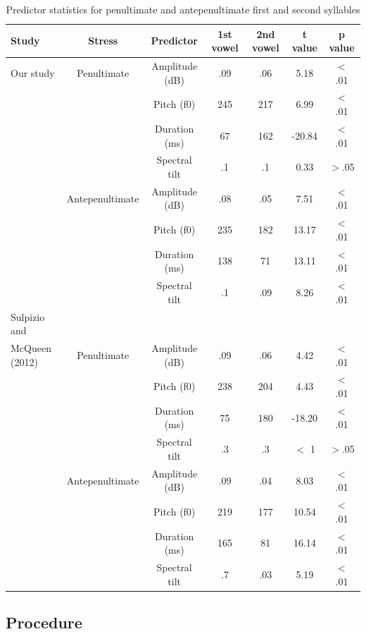 \begin{table}[ht]
\centering
\caption{Predictor statistics for penultimate and antepenultimate first and second syllables}
\begin{tabular*}{\textwidth}{@{\extracolsep{\fill}} lcccccc}
\hline
\textbf{Study} & \textbf{Stress} & \textbf{Predictor} & \textbf{1st vowel} & \textbf{2nd vowel} &\textbf{t value} & \textbf{p value}\\
\hline
Our study & Penultimate & Amplitude (dB)       & .09 & .06 & 5.18  & $<$ .01\\
     &           & Pitch (f0)           & 245 & 217 & 6.99  & $<$ .01\\
     &             & Duration (ms)        & 67 & 162 & -20.84 & $<$ .01\\
     &             & Spectral tilt   & .1 & .1 & 0.33  & $>$.05 \\
 & Antepenultimate & Amplitude (dB)      & .08 & .05 & 7.51  & $<$ .01\\
     &             & Pitch (f0)          & 235 & 182 & 13.17 & $<$ .01\\
     &             & Duration (ms)        & 138 & 71 & 13.11 & $<$ .01\\
     &             & Spectral tilt   & .1 & .09 & 8.26  & $<$ .01\\
\hline
Sulpizio and\\ McQueen (2012) &Penultimate & Amplitude (dB)    & .09 & .06   & 4.42 & $<$ .01\\
       &           & Pitch (f0)         & 238  & 204 & 4.43 & $<$ .01\\
       &           & Duration (ms)      & 75 & 180   & -18.20 & $<$ .01\\
       &           & Spectral tilt &.3 & .3 & $<$ 1  & $>$.05\\
& Antepenultimate  & Amplitude (dB)     & .09  & .04 & 8.03  & $<$ .01\\
       &           & Pitch (f0)         &  219 & 177 & 10.54  & $<$ .01\\
       &           & Duration (ms)      & 165  & 81  & 16.14  & $<$ .01\\
       &           & Spectral tilt &  .7  & .03  & 5.19  & $<$ .01\\
\hline
\end{tabular*}
\label{tab:acoustics}
\end{table}

\subsection{Procedure}

